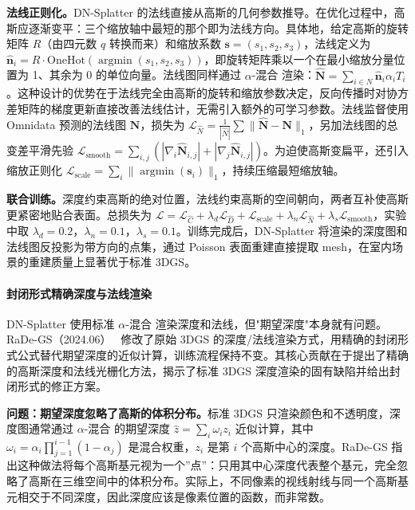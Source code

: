 \textbf{法线正则化。}DN-Splatter 的法线直接从高斯的几何参数推导。在优化过程中，高斯应逐渐变平：三个缩放轴中最短的那个即为法线方向。具体地，给定高斯的旋转矩阵 $R$（由四元数 $q$ 转换而来）和缩放系数 $\boldsymbol{s} = (s_1, s_2, s_3)$，法线定义为 $\hat{\boldsymbol{n}}_i = R \cdot \text{OneHot}(\operatorname{argmin}(s_1, s_2, s_3))$，即旋转矩阵乘以一个在最小缩放分量位置为 1、其余为 0 的单位向量。法线图同样通过 $\alpha$-混合 渲染：$\hat{\boldsymbol{N}} = \sum_{i \in N} \hat{\boldsymbol{n}}_i \alpha_i T_i$。这种设计的优势在于法线完全由高斯的旋转和缩放参数决定，反向传播时对协方差矩阵的梯度更新直接改善法线估计，无需引入额外的可学习参数。法线监督使用 Omnidata 预测的法线图 $\boldsymbol{N}$，损失为 $\mathcal{L}_{\hat{N}} = \frac{1}{|\hat{N}|} \sum \|\hat{\boldsymbol{N}} - \boldsymbol{N}\|_1$，另加法线图的总变差平滑先验 $\mathcal{L}_{\text{smooth}} = \sum_{i,j}(|\nabla_i \hat{\boldsymbol{N}}_{i,j}| + |\nabla_j \hat{\boldsymbol{N}}_{i,j}|)$。为迫使高斯变扁平，还引入缩放正则化 $\mathcal{L}_{\text{scale}} = \sum_i \|\operatorname{argmin}(\boldsymbol{s}_i)\|_1$，持续压缩最短缩放轴。

\textbf{联合训练。}深度约束高斯的绝对位置，法线约束高斯的空间朝向，两者互补使高斯更紧密地贴合表面。总损失为 $\mathcal{L} = \mathcal{L}_{\hat{C}} + \lambda_d \mathcal{L}_{\hat{D}} + \mathcal{L}_{\text{scale}} + \lambda_n \mathcal{L}_{\hat{N}} + \lambda_s \mathcal{L}_{\text{smooth}}$，实验中取 $\lambda_d = 0.2$，$\lambda_n = 0.1$，$\lambda_s = 0.1$。训练完成后，DN-Splatter 将渲染的深度图和法线图反投影为带方向的点集，通过 Poisson 表面重建直接提取 mesh，在室内场景的重建质量上显著优于标准 3DGS。

\paragraph{封闭形式精确深度与法线渲染}

DN-Splatter 使用标准 $\alpha$-混合 渲染深度和法线，但"期望深度"本身就有问题。RaDe-GS（2024.06）~\cite{2406_01467} 修改了原始 3DGS 的深度/法线渲染方式，用精确的封闭形式公式替代期望深度的近似计算，训练流程保持不变。其核心贡献在于提出了精确的高斯深度和法线光栅化方法，揭示了标准 3DGS 深度渲染的固有缺陷并给出封闭形式的修正方案。

\textbf{问题：期望深度忽略了高斯的体积分布。}标准 3DGS 只渲染颜色和不透明度，深度图通常通过 $\alpha$-混合 的期望深度 $\hat{z} = \sum_i \omega_i z_i$ 近似计算，其中 $\omega_i = \alpha_i \prod_{j=1}^{i-1}(1-\alpha_j)$ 是混合权重，$z_i$ 是第 $i$ 个高斯中心的深度。RaDe-GS 指出这种做法将每个高斯基元视为一个”点”：只用其中心深度代表整个基元，完全忽略了高斯在三维空间中的体积分布。实际上，不同像素的视线射线与同一个高斯基元相交于不同深度，因此深度应该是像素位置的函数，而非常数。

